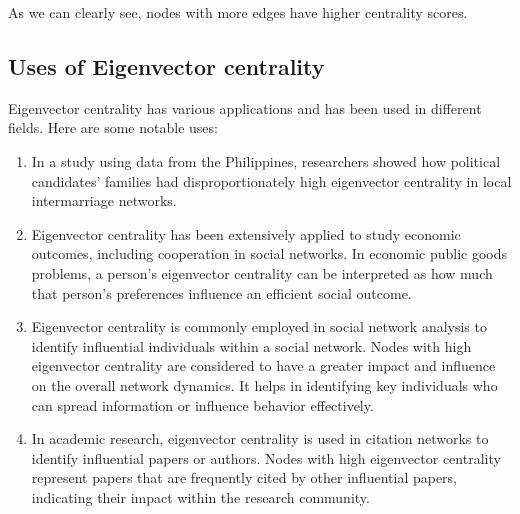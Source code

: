 \documentclass{article}
\begin{document}
    As we can clearly see, nodes with more edges have higher centrality scores.

    \subsection{Uses of Eigenvector centrality}
    Eigenvector centrality has various applications and has been used in different fields. Here are some notable uses:
    \begin{enumerate}
        \item In a study using data from the Philippines, researchers showed how political candidates' families had disproportionately high eigenvector centrality in local intermarriage networks.
        \item Eigenvector centrality has been extensively applied to study economic outcomes, including cooperation in social networks. In economic public goods problems, a person's eigenvector centrality can be interpreted as how much that person's preferences influence an efficient social outcome.
        \item Eigenvector centrality is commonly employed in social network analysis to identify influential individuals within a social network. Nodes with high eigenvector centrality are considered to have a greater impact and influence on the overall network dynamics. It helps in identifying key individuals who can spread information or influence behavior effectively.
        \item In academic research, eigenvector centrality is used in citation networks to identify influential papers or authors. Nodes with high eigenvector centrality represent papers that are frequently cited by other influential papers, indicating their impact within the research community.
    \end{enumerate}
\end{document}
